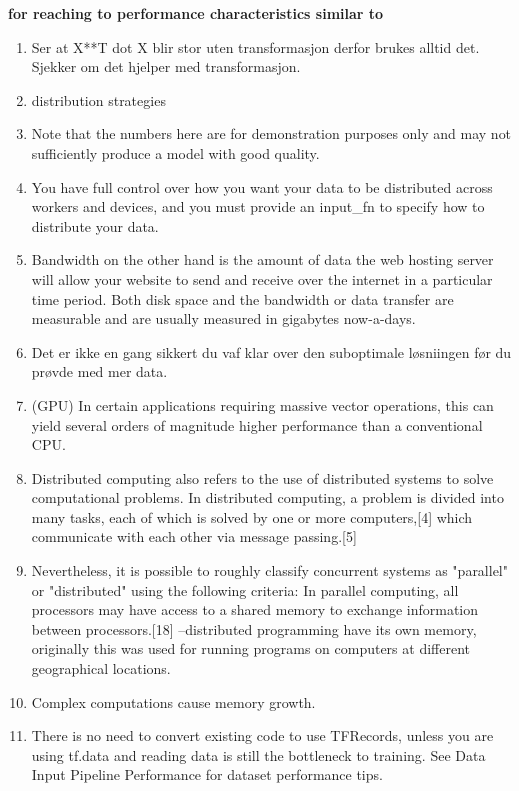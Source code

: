 \textbf{for reaching to performance characteristics similar to }
\begin{enumerate}
    \item Ser at X**T dot X blir stor uten transformasjon derfor brukes alltid det. Sjekker om det hjelper med transformasjon.
    \item distribution strategies
    \item Note that the numbers here are for demonstration purposes only and may not sufficiently produce a model with good quality.
    \item You have full control over how you want your data to be distributed across workers and devices, and you must provide an input\_fn to specify how to distribute your data.
    \item Bandwidth on the other hand is the amount of data the web hosting server will allow your website to send and receive over the internet in a particular time period. Both disk space and the bandwidth or data transfer are measurable and are usually measured in gigabytes now-a-days.
    \item Det er ikke en gang sikkert du vaf klar over den suboptimale løsniingen før du prøvde med mer data. 
    \item (GPU) In certain applications requiring massive vector operations, this can yield several orders of magnitude higher performance than a conventional CPU. 
    \item Distributed computing also refers to the use of distributed systems to solve computational problems. In distributed computing, a problem is divided into many tasks, each of which is solved by one or more computers,[4] which communicate with each other via message passing.[5] 
    \item Nevertheless, it is possible to roughly classify concurrent systems as "parallel" or "distributed" using the following criteria: In parallel computing, all processors may have access to a shared memory to exchange information between processors.[18] --distributed programming have its own memory, originally this was used for running programs on computers at different geographical locations. 
    \item Complex computations cause memory growth.
    \item There is no need to convert existing code to use TFRecords, unless you are using tf.data and reading data is still the bottleneck to training. See Data Input Pipeline Performance for dataset performance tips.

\end{enumerate}
